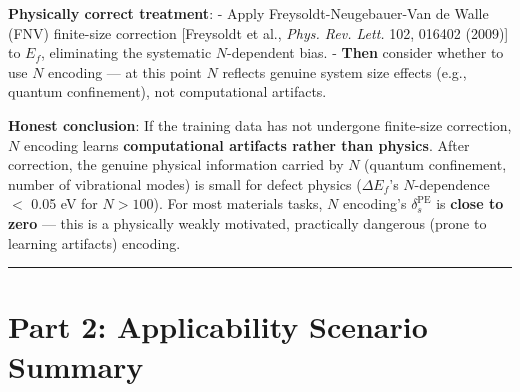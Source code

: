 \documentclass[
  12pt,
]{article}
\begin{document}
\textbf{Physically correct treatment}:
- Apply Freysoldt-Neugebauer-Van de Walle (FNV) finite-size correction [Freysoldt et al., \emph{Phys. Rev. Lett.} 102, 016402 (2009)] to $E_f$, eliminating the systematic $N$-dependent bias.
- \textbf{Then} consider whether to use $N$ encoding --- at this point $N$ reflects genuine system size effects (e.g., quantum confinement), not computational artifacts.

\textbf{Honest conclusion}: If the training data has not undergone finite-size correction, $N$ encoding learns \textbf{computational artifacts rather than physics}. After correction, the genuine physical information carried by $N$ (quantum confinement, number of vibrational modes) is small for defect physics ($\Delta E_f$'s $N$-dependence $<$ 0.05 eV for $N > 100$). For most materials tasks, $N$ encoding's $\delta_s^{\text{PE}}$ is \textbf{close to zero} --- this is a physically weakly motivated, practically dangerous (prone to learning artifacts) encoding.

\begin{center}\rule{0.5\linewidth}{0.5pt}\end{center}

\section{Part 2: Applicability Scenario Summary}\label{part-2-applicability-scenario-summary}
\end{document}
